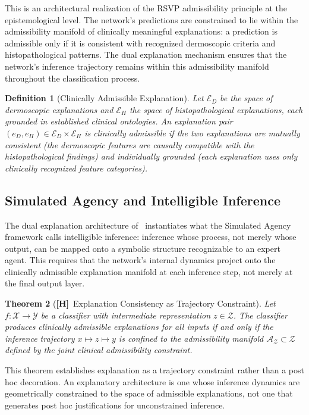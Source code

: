 \documentclass[11pt, oneside]{article}
\numberwithin{equation}{section}
\newcommand{\ClaimH}{\textcolor{rsvpgray}{\textbf{[H]}}}
\theoremstyle{rsvpstyle}
\newtheorem{theorem}{Theorem}[section]
\newtheorem{definition}[theorem]{Definition}
\theoremstyle{remark}
\newcommand{\Adm}{\mathcal{A}}
\begin{document}
This is an architectural realization of the RSVP admissibility principle at the
epistemological level. The network's predictions are constrained to lie within the
admissibility manifold of clinically meaningful explanations: a prediction is admissible
only if it is consistent with recognized dermoscopic criteria and histopathological
patterns. The dual explanation mechanism ensures that the network's inference trajectory
remains within this admissibility manifold throughout the classification process.

\begin{definition}[Clinically Admissible Explanation]
Let $\mathcal{E}_D$ be the space of dermoscopic explanations and $\mathcal{E}_H$ the
space of histopathological explanations, each grounded in established clinical
ontologies. An explanation pair $(e_D, e_H) \in \mathcal{E}_D \times \mathcal{E}_H$ is
clinically admissible if the two explanations are mutually consistent (the dermoscopic
features are causally compatible with the histopathological findings) and individually
grounded (each explanation uses only clinically recognized feature categories).
\end{definition}

\subsection{Simulated Agency and Intelligible Inference}

The dual explanation architecture of~\cite{Matas2026BCC} instantiates what the
Simulated Agency framework calls intelligible inference: inference whose process, not
merely whose output, can be mapped onto a symbolic structure recognizable to an expert
agent. This requires that the network's internal dynamics project onto the clinically
admissible explanation manifold at each inference step, not merely at the final
output layer.

\begin{theorem}[\ClaimH\ Explanation Consistency as Trajectory Constraint]
\label{thm:explanation}
Let $f : \mathcal{X} \to \mathcal{Y}$ be a classifier with intermediate representation
$z \in \mathcal{Z}$. The classifier produces clinically admissible explanations for
all inputs if and only if the inference trajectory $x \mapsto z \mapsto y$ is confined
to the admissibility manifold $\Adm_\mathcal{Z} \subset \mathcal{Z}$ defined by the
joint clinical admissibility constraint.
\end{theorem}

This theorem establishes explanation as a trajectory constraint rather than a
post hoc decoration. An explanatory architecture is one whose inference dynamics
are geometrically constrained to the space of admissible explanations, not one that
generates post hoc justifications for unconstrained inference.
\end{document}

